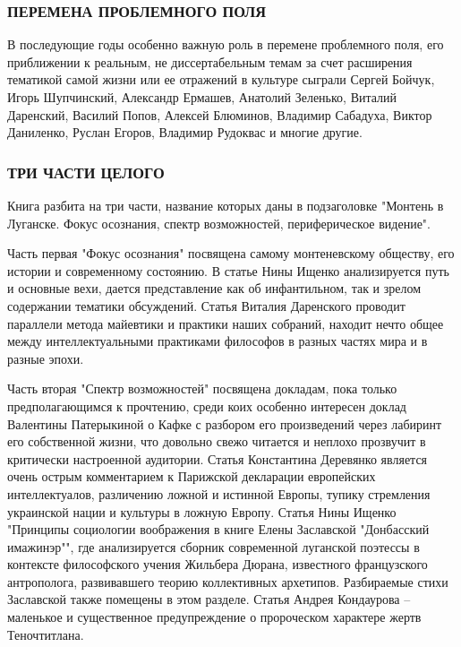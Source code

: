 \subsubsection{ПЕРЕМЕНА ПРОБЛЕМНОГО ПОЛЯ}

В последующие годы особенно важную роль в перемене проблемного поля, его
приближении к реальным, не диссертабельным темам за счет расширения тематикой
самой жизни или ее отражений в культуре сыграли Сергей Бойчук, Игорь
Шупчинский, Александр Ермашев, Анатолий Зеленько, Виталий Даренский, Василий
Попов, Алексей Блюминов, Владимир Сабадуха, Виктор Даниленко, Руслан Егоров,
Владимир Рудоквас и многие другие.

\subsubsection{ТРИ ЧАСТИ ЦЕЛОГО}

Книга разбита на три части, название которых даны в подзаголовке "Монтень
в Луганске. Фокус осознания, спектр возможностей, периферическое видение".

Часть первая "Фокус осознания" посвящена самому монтеневскому обществу,
его истории и современному состоянию. В статье Нины Ищенко анализируется
путь и основные вехи, дается представление как об инфантильном, так и
зрелом содержании тематики обсуждений. Статья Виталия Даренского проводит
параллели метода майевтики и практики наших собраний, находит нечто общее
между интеллектуальными практиками философов в разных частях мира и в
разные эпохи.

Часть вторая "Спектр возможностей" посвящена докладам, пока только
предполагающимся к прочтению, среди коих особенно интересен доклад Валентины
Патерыкиной о Кафке с разбором его произведений через лабиринт его собственной
жизни, что довольно свежо читается и неплохо прозвучит в критически настроенной
аудитории. Статья Константина Деревянко является очень острым комментарием к
Парижской декларации европейских интеллектуалов, различению ложной и истинной
Европы, тупику стремления украинской нации и культуры в ложную Европу. Статья
Нины Ищенко "Принципы социологии воображения в книге Елены Заславской
"Донбасский имажинэр"", где анализируется сборник современной луганской
поэтессы в контексте философского учения Жильбера Дюрана, известного
французского антрополога, развивавшего теорию коллективных архетипов.
Разбираемые стихи Заславской также помещены в этом разделе. Статья Андрея
Кондаурова – маленькое и существенное предупреждение о пророческом характере
жертв Теночтитлана.

